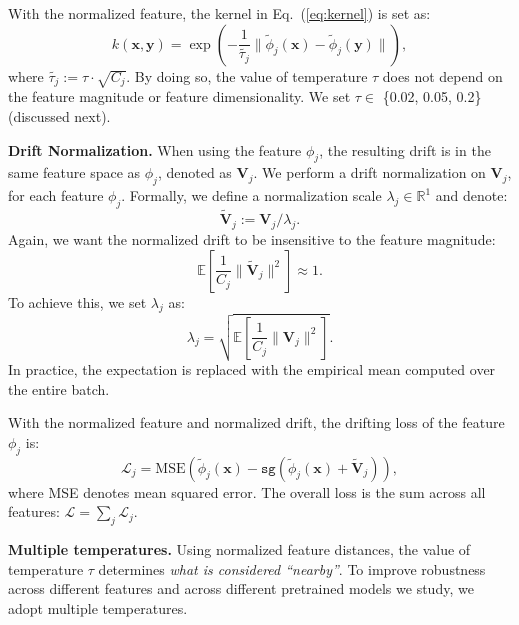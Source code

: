 \documentclass{article}
\newcommand{\vv}[1]{\mathbf{#1}}
\newcommand{\x}{\vv{x}}
\newcommand{\y}{\vv{y}}
\newcommand{\V}{\vv{V}}
\renewcommand{\paragraph}[1]{\vspace{.05em}\noindent\textbf{#1}}
\theoremstyle{plain}
\theoremstyle{definition}
\theoremstyle{remark}
\begin{document}
With the normalized feature, the kernel in Eq.~(\ref{eq:kernel}) is set as:
\begin{equation}
k(\x, \y) = \exp\left(-\frac{1}{\tilde{\tau_j}} \|\tilde{\phi}_j(\x) - \tilde{\phi}_j(\y)\|\right),
\end{equation}
where $\tilde{\tau_j}:=\tau{\cdot}\sqrt{C_j}$. By doing so, the value of temperature $\tau$ does not depend on the feature magnitude or feature dimensionality. We set $\tau \in$ \{0.02, 0.05, 0.2\} (discussed next).

\paragraph{Drift Normalization.} When using the feature $\phi_j$, the resulting drift is in the same feature space as $\phi_j$, denoted as $\V_j$. We perform a drift normalization on $\V_j$, for each feature $\phi_j$. Formally, we define a normalization scale $\lambda_j \in \mathbb{R}^1$ and denote:
\begin{equation}
\tilde{\V}_j:=\V_j / \lambda_j.
\end{equation}
Again, we want the normalized drift to be insensitive to the feature magnitude:
\begin{equation}
\mathbb{E} \left[ \frac{1}{C_j}\| \tilde{\V}_j \|^2 \right] \approx 1.
\end{equation}
To achieve this, we set $\lambda_j$ as:
\begin{equation}
\label{eq:lambda}
\lambda_j = \sqrt{\mathbb{E} \left[ \frac{1}{C_j} \| \V_j \|^2 \right]}.
\end{equation}
In practice, the expectation is replaced with the empirical mean computed over the entire batch.

With the normalized feature and normalized drift, the drifting loss of the feature $\phi_j$ is:
\begin{equation}
\label{eq:mse_loss_j}
\mathcal{L}_j = \text{MSE}(\tilde\phi_j({\x}) -  \texttt{sg}(\tilde\phi_j({\x}) + \tilde{\V}_j)),
\end{equation}
where MSE denotes mean squared error.
The overall loss is the sum across all features:
$\mathcal{L} = \sum_j {\mathcal{L}_j}$.

\paragraph{Multiple temperatures.}
Using normalized feature distances, the value of temperature $\tau$ determines \textit{what is considered ``nearby''}.
To improve robustness across different features and across different pretrained models we study, we adopt multiple temperatures.
\end{document}
